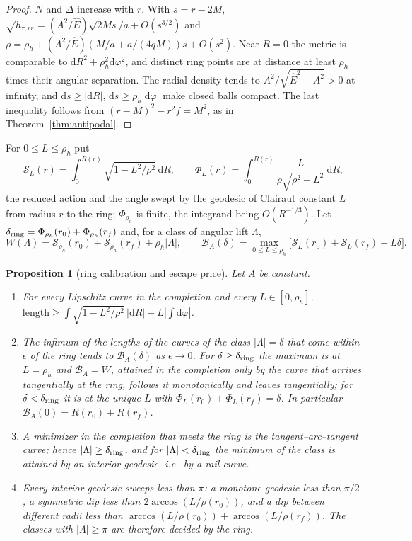 \documentclass[aip,jmp,amsmath,amssymb,reprint]{revtex4-2}
\newcommand{\Ehat}{\hat E}
\newcommand{\dd}{\mathrm{d}}
\theoremstyle{plain}
\newtheorem{proposition}{Proposition}[section]
\theoremstyle{definition}
\begin{document}
\begin{proof}
$N$ and $\Delta$ increase with $r$. With $s=r-2M$, $\sqrt{h_{\tau,rr}}=(A^2/\Ehat)\sqrt{2Ms}/a+O(s^{3/2})$ and
$\rho=\rho_h+(A^2/\Ehat)(M/a+a/(4qM))s+O(s^2)$. Near $R=0$ the metric is comparable to
$\dd R^2+\rho_h^2\dd\varphi^2$, and distinct ring points are at distance at least $\rho_h$ times their
angular separation. The radial density tends to $A^2/\sqrt{\Ehat^2-A^2}>0$ at infinity, and
$\dd s\ge|\dd R|$, $\dd s\ge\rho_h|\dd\varphi|$ make closed balls compact. The last inequality follows from $(r-M)^2-r^2f=M^2$, as in
Theorem~\ref{thm:antipodal}.
\end{proof}

For $0\le L\le\rho_h$ put
\[
  \mathcal S_L(r)=\int_0^{R(r)}\sqrt{1-L^2/\rho^2}\,\dd R,\qquad
  \Phi_L(r)=\int_0^{R(r)}\frac{L}{\rho\sqrt{\rho^2-L^2}}\,\dd R,
\]
the reduced action and the angle swept by the geodesic of Clairaut constant $L$ from radius $r$ to
the ring; $\Phi_{\rho_h}$ is finite, the integrand being $O(R^{-1/3})$. Let $\delta_{\rm ring}=\Phi_{\rho_h}(r_0)+\Phi_{\rho_h}(r_f)$ and,
for a class of angular lift $\Lambda$,
\begin{equation}
  W(\Lambda)=\mathcal S_{\rho_h}(r_0)+\mathcal S_{\rho_h}(r_f)+\rho_h|\Lambda|,\qquad
  \mathcal B_A(\delta)=\max_{0\le L\le\rho_h}\bigl[\mathcal S_L(r_0)+\mathcal S_L(r_f)+L\delta\bigr].
  \label{eq:tau-eq-price}
\end{equation}

\begin{proposition}[ring calibration and escape price]\label{prop:tau-eq-price}
Let $A$ be constant.
\begin{enumerate}
\item For every Lipschitz curve in the completion and every $L\in[0,\rho_h]$,
  $\mathrm{length}\ge\int\sqrt{1-L^2/\rho^2}\,|\dd R|+L|\int\dd\varphi|$.
\item The infimum of the lengths of the curves of the class $|\Lambda|=\delta$ that come within
  $\epsilon$ of the ring tends to $\mathcal B_A(\delta)$ as $\epsilon\to0$. For $\delta\ge\delta_{\rm ring}$ the
  maximum is at $L=\rho_h$ and $\mathcal B_A=W$, attained in the completion only by the curve that
  arrives tangentially at the ring, follows it monotonically and leaves tangentially; for
  $\delta<\delta_{\rm ring}$ it is at the unique $L$ with $\Phi_L(r_0)+\Phi_L(r_f)=\delta$. In particular
  $\mathcal B_A(0)=R(r_0)+R(r_f)$.
\item A minimizer in the completion that meets the ring is the tangent--arc--tangent curve;
  hence $|\Lambda|\ge\delta_{\rm ring}$, and for $|\Lambda|<\delta_{\rm ring}$ the minimum of the class is attained by
  an interior geodesic, i.e.\ by a rail curve.
\item Every interior geodesic sweeps less than $\pi$: a monotone geodesic less than $\pi/2$, a
  symmetric dip less than $2\arccos(L/\rho(r_0))$, and a dip between different radii less than
  $\arccos(L/\rho(r_0))+\arccos(L/\rho(r_f))$. The classes with
  $|\Lambda|\ge\pi$ are therefore decided by the ring.
\end{enumerate}
\end{proposition}
\end{document}
